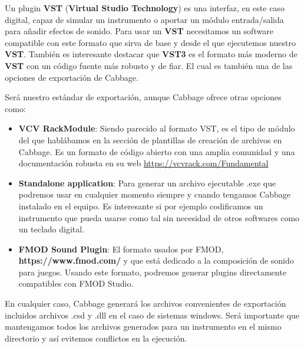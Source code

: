 Un plugin \textbf{VST} (\textbf{Virtual Studio Technology}) es una interfaz, en este caso digital, capaz de simular un instrumento o aportar un módulo entrada/salida para añadir efectos de sonido. Para usar un \textbf{VST} necesitamos un software compatible con este formato que sirva de base y desde el que ejecutemos nuestro \textbf{VST}. 
También es interesante destacar que \textbf{VST3} es el formato más moderno de \textbf{VST} con un código fuente más robusto y de fiar. El cual es también una de las opciones de exportación de Cabbage.

Será nuestro estándar de exportación, aunque Cabbage ofrece otras opciones como:

\begin{itemize}
 \item \textbf{VCV RackModule}: Siendo parecido al formato VST, es el tipo de módulo del que hablábamos en la sección de plantillas de creación de archivos en Cabbage. Es un formato de código abierto con una amplia comunidad y una documentación robusta en su web \url{https://vcvrack.com/Fundamental}
 \item \textbf{Standalone application}: Para generar un archivo ejecutable .exe que podremos usar en cualquier momento siempre y cuando tengamos Cabbage instalado en el equipo. Es interesante si por ejemplo codificamos un instrumento que pueda usarse como tal sin necesidad de otros softwares como un teclado digital.
 \item \textbf{FMOD Sound Plugin}: El formato usados por FMOD, \textbf{https://www.fmod.com/} y que está dedicado a la composición de sonido para juegos. Usando este formato, podremos generar plugins directamente compatibles con FMOD Studio.
\end{itemize}

En cualquier caso, Cabbage generará los archivos convenientes de exportación incluidos archivos .csd y .dll en el caso de sistemas windows. Será importante que mantengamos todos los archivos generados para un instrumento en el mismo directorio y así evitemos conflictos en la ejecución.


